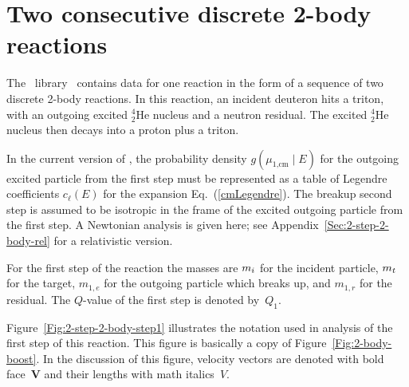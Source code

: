 {
\newcommand{\Vacm}{\textbf{V}_{\text{1,cm}}}
\newcommand{\vacm}{V_{\text{1,cm}}}
\newcommand{\muacm}{\mu_{\text{1,cm}}}
\newcommand{\Valab}{\textbf{V}_{\text{1,lab}}}
\newcommand{\valab}{V_{\text{1,lab}}}
\newcommand{\Vbcm}{\textbf{V}_{\text{2,cm}}}
\newcommand{\Vblab}{\textbf{V}_{\text{2,lab}}}
\newcommand{\vblab}{V_{\text{2,lab}}}
\newcommand{\mualab}{\mu_{\text{1,lab}}}
\newcommand{\vbcm}{V_{\text{2,cm}}}
\newcommand{\mubcm}{\mu_{\text{2,cm}}}
\newcommand{\mayo}{m_{1,e}}
\newcommand{\mares}{m_{1,r}}
\newcommand{\mbyo}{m_{2,e}}
\newcommand{\mbres}{m_{2,r}}

\section{Two consecutive discrete 2-body reactions}
\label{Sec:2-step-2-body}
The \ENDFdata\ library~\cite{ENDFdata} contains data for one
reaction in the form of a sequence of two discrete 2-body reactions.
In this reaction, an incident deuteron hits a triton, with 
an outgoing excited ${}_2^4\text{He}$ nucleus and a neutron residual. 
The  excited ${}_2^4\text{He}$ nucleus then decays into a proton plus
a triton.  

\begin{figure}

\end{figure}

In the current version of \gettransfer, the probability
density $g( \muacm \mid E)$ 
for the outgoing excited particle from the first step
must be represented as a table of Legendre
coefficients $c_\ell(E)$ 
for the expansion Eq.~(\ref{cmLegendre}).
The breakup second step is assumed
to be isotropic in the frame of the excited outgoing particle
from the first step.  A Newtonian analysis is given
here; see Appendix~\ref{Sec:2-step-2-body-rel} for a
relativistic version.

For the first step of the
reaction the masses are $m_i$ for the incident particle,
$m_t$ for the target, $\mayo$ for the outgoing particle 
which breaks up, and $\mares$ for the residual.  The $Q$-value
of the first step is denoted by~$Q_1$.

Figure~\ref{Fig:2-step-2-body-step1} illustrates
the notation used in analysis of the first step of this reaction.  
This figure is basically a copy of Figure~\ref{Fig:2-body-boost}.
In the discussion of
this figure, velocity vectors are denoted with bold 
face~$\textbf{V}$ and their
lengths with math italics~$V$.  

}
